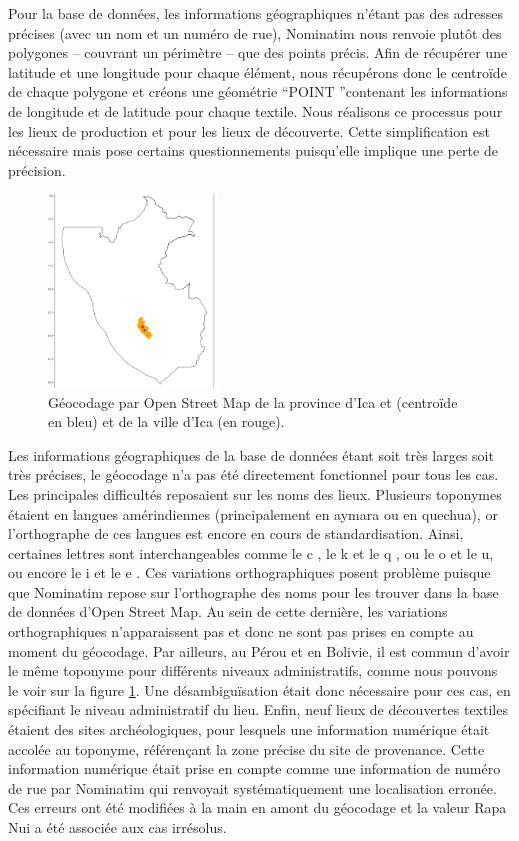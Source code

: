 Pour la base de données, les informations géographiques n'étant pas des adresses précises (avec un nom et un numéro de rue), Nominatim nous renvoie plutôt des polygones -- couvrant un périmètre -- que des points précis. Afin de récupérer une latitude et une longitude pour chaque élément, nous récupérons donc le centroïde de chaque polygone et créons une géométrie \textquotedblleft POINT \textquotedblright \:contenant les informations de longitude et de latitude pour chaque textile. Nous réalisons ce processus pour les lieux de production et pour les lieux de découverte. Cette simplification est nécessaire mais pose certains questionnements puisqu'elle implique une perte de précision.

\begin{figure}
    \centering
    \includegraphics[width=0.4\textwidth]{../images/Ica.png}
    \caption{Géocodage par Open Street Map de la province d'Ica et (centroïde en bleu) et de la ville d'Ica (en rouge).}
    \label{fig:Ica}
\end{figure}

Les informations géographiques de la base de données étant soit très larges soit très précises, le géocodage n'a pas été directement fonctionnel pour tous les cas. Les principales difficultés reposaient sur les noms des lieux. Plusieurs toponymes étaient en langues amérindiennes (principalement en aymara ou en quechua), or l'orthographe de ces langues est encore en cours de standardisation. Ainsi, certaines lettres sont interchangeables comme le \og c \fg, le \og k \fg \:et le \og q \fg, ou le \og o \fg \:et le \og u\fg, ou encore le \og i \fg \:et le \og e \fg. Ces variations orthographiques posent problème puisque que Nominatim repose sur l'orthographe des noms pour les trouver dans la base de données d'Open Street Map. Au sein de cette dernière, les variations orthographiques n'apparaissent pas et donc ne sont pas prises en compte au moment du géocodage. Par ailleurs, au Pérou et en Bolivie, il est commun d'avoir le même toponyme pour différents niveaux administratifs, comme nous pouvons le voir sur la figure \ref{fig:Ica}. Une désambiguïsation était donc nécessaire pour ces cas, en spécifiant le niveau administratif du lieu. Enfin, neuf lieux de découvertes textiles étaient des sites archéologiques, pour lesquels une information numérique était accolée au toponyme, référençant la zone précise du site de provenance. Cette information numérique était prise en compte comme une information de numéro de rue par Nominatim qui renvoyait systématiquement une localisation erronée. Ces erreurs ont été modifiées à la main en amont du géocodage et la valeur \og Rapa Nui \fg \:a été associée aux cas irrésolus.


